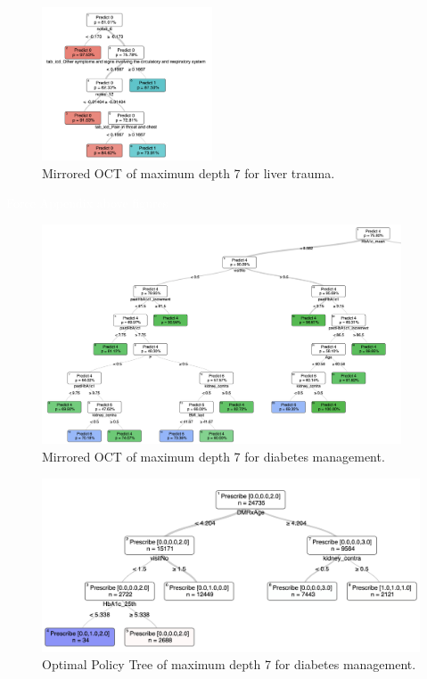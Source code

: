 \documentclass[10pt]{article} %
\begin{document}
\begin{figure}
  \begin{center}
    \caption{Mirrored OCT of maximum depth 7 for liver trauma.}\label{fig:liver-octpnn} \includegraphics[width=0.45\textwidth] {images/Liver_OCT_seed5_iter5.png}
    \end{center}
\end{figure}


\textcolor{white}{Force Appendix above figures}

\begin{figure}
  \begin{center}
    \caption{Mirrored OCT of maximum depth 7 for diabetes management.}\label{fig:diabetes-octpnn} \includegraphics[width=0.95\textwidth,height=0.5\textwidth] {images/Diabetes_OCT_seed2_iter1.png}
    \end{center}
\end{figure}

\begin{figure}
  \begin{center}
    \caption{Optimal Policy Tree of maximum depth 7 for diabetes management.}\label{fig:diabetes-opt}
  \includegraphics[height=0.25\textwidth]{images/Diabetes_OPT_seed2_iter1.png}
  \end{center}
\end{figure}
\end{document}
